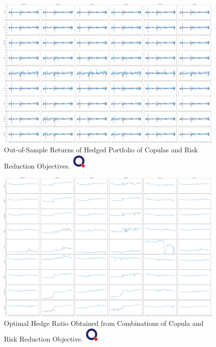 \newpage
\begin{landscape}
\begin{figure}[th]
   \centering
   \includegraphics[width=\linewidth]{_pics/Rhs.pdf}
   \caption{Out-of-Sample Returns of Hedged Portfolio of Copulas and Risk Reduction Objectives.
   \href{http://www.quantlet.com/}{\includegraphics[width=20pt]{_pics/qletlogo_tr.png}}}
   \label{fig:OOSRH}
\end{figure}
\end{landscape}
\newpage

\newpage
\begin{landscape}
\begin{figure}[th]
   \centering
   \includegraphics[width=\linewidth]{_pics/OHRs.pdf}
   \caption{Optimal Hedge Ratio Obtained from Combinations of Copula and Risk Reduction Objective.
   \href{http://www.quantlet.com/}{\includegraphics[width=20pt]{_pics/qletlogo_tr.png}}}
   \label{fig:OHRs}
\end{figure}
\end{landscape}
\newpage


